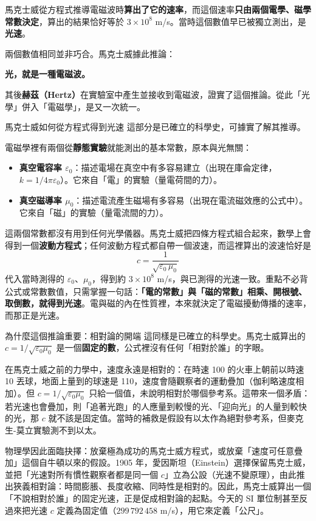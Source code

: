 \documentclass[11pt]{article}
\begin{document}
馬克士威從方程式推導電磁波時\textbf{算出了它的速率}，而這個速率\textbf{只由兩個電學、磁學常數決定}，算出的結果恰好等於 $3\times10^8$ m/s。當時這個數值早已被獨立測出，是\textbf{光速}。

兩個數值相同並非巧合。馬克士威據此推論：

\begin{center}
\textbf{光，就是一種電磁波。}
\end{center}

其後\textbf{赫茲（Hertz）}在實驗室中產生並接收到電磁波，證實了這個推論。從此「光學」併入「電磁學」，是又一次統一。

\begin{延伸框}{馬克士威如何從方程式得到光速}
這部分是已確立的科學史，可據實了解其推導。

電磁學裡有兩個從\textbf{靜態實驗}就能測出的基本常數，原本與光無關：
\begin{itemize}\setlength{\itemsep}{1pt}
\item \textbf{真空電容率 $\varepsilon_0$}：描述電場在真空中有多容易建立（出現在庫侖定律，$k=1/4\pi\varepsilon_0$）。它來自「電」的實驗（量電荷間的力）。
\item \textbf{真空磁導率 $\mu_0$}：描述電流產生磁場有多容易（出現在電流磁效應的公式中）。它來自「磁」的實驗（量電流間的力）。
\end{itemize}
這兩個常數都沒有用到任何光學儀器。馬克士威把四條方程式組合起來，數學上會得到一個\textbf{波動方程式}；任何波動方程式都自帶一個波速，而這裡算出的波速恰好是
$$\boxed{\;c=\frac{1}{\sqrt{\varepsilon_0\,\mu_0}}\;}$$
代入當時測得的 $\varepsilon_0$、$\mu_0$，得到約 $3\times10^8$ m/s，與已測得的光速一致。重點不必背公式或常數數值，只需掌握一句話：\textbf{「電的常數」與「磁的常數」相乘、開根號、取倒數，就得到光速}。電與磁的內在性質裡，本來就決定了電磁擾動傳播的速率，而那正是光速。
\end{延伸框}

\begin{延伸框}{為什麼這個推論重要：相對論的開端}
這同樣是已確立的科學史。馬克士威算出的 $c=1/\sqrt{\varepsilon_0\mu_0}$ 是一個\textbf{固定的數}，公式裡沒有任何「相對於誰」的字眼。

在馬克士威之前的力學中，速度永遠是相對的：在時速 100 的火車上朝前以時速 10 丟球，地面上量到的球速是 110，速度會隨觀察者的運動疊加（伽利略速度相加）。但 $c=1/\sqrt{\varepsilon_0\mu_0}$ 只給一個值，未說明相對於哪個參考系。這帶來一個矛盾：若光速也會疊加，則「追著光跑」的人應量到較慢的光、「迎向光」的人量到較快的光，那 $c$ 就不該是固定值。當時的補救是假設有以太作為絕對參考系，但麥克生-莫立實驗測不到以太。

物理學因此面臨抉擇：放棄極為成功的馬克士威方程式，或放棄「速度可任意疊加」這個自牛頓以來的假設。1905 年，愛因斯坦（Einstein）選擇保留馬克士威，並把「光速對所有慣性觀察者都是同一個 $c$」立為公設（光速不變原理），由此推出狹義相對論：時間膨脹、長度收縮、同時性是相對的。因此，馬克士威算出一個「不說相對於誰」的固定光速，正是促成相對論的起點。今天的 SI 單位制甚至反過來把光速 $c$ 定義為固定值（$299\,792\,458$ m/s），用它來定義「公尺」。
\end{延伸框}
\end{document}
